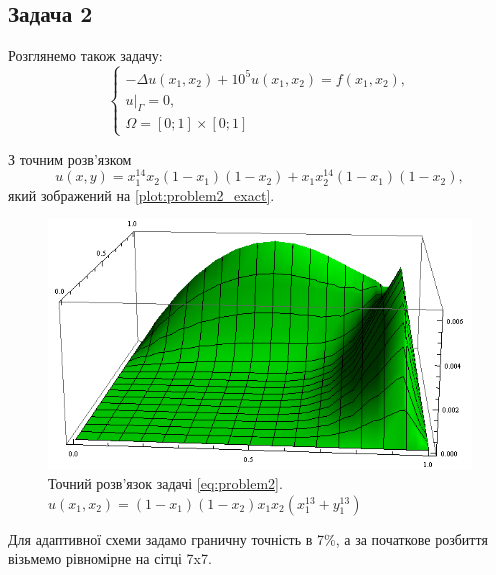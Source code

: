 
\subsection{Задача 2}

Розглянемо також задачу:
\begin{equation}\label{eq:problem2}
\begin{cases}
	- \Delta u(x_1,x_2) + 10^5 u(x_1, x_2) = f(x_1,x_2), \\
	u|_\Gamma = 0 ,\\
	\Omega = \left[0;1\right] \times \left[0;1\right]
\end{cases}
\end{equation}

З точним розв'язком
\begin{equation}
	u(x,y) = x_1^{14}x_2(1-x_1)(1-x_2)+x_1 x_2^{14}(1-x_1)(1-x_2),
\end{equation}
%
який зображений на \autoref{plot:problem2_exact}.
\begin{figure}[H]
	\centering
    \includegraphics[scale=0.7]{problem2/ExactSolution}
    \captionsetup{format=hang,justification=centering}
    \caption{Точний розв'язок задачі \eqref{eq:problem2}. \newline $u(x_1,x_2) = (1-x_1)(1-x_2)x_1x_2(x_1^{13}+y_1^{13})$ }
    \label{plot:problem2_exact}
\end{figure}

Для адаптивної схеми задамо граничну точність в 7\%, а за початкове розбиття візьмемо рівномірне на сітці 7x7.


